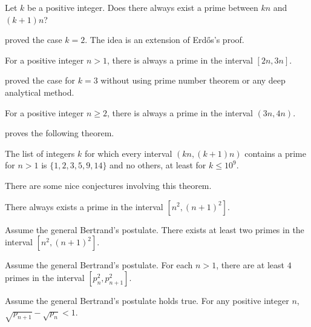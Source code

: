 \documentclass{subfile}
\begin{document}
	\begin{problem}
		Let $k$ be a positive integer. Does there always exist a prime between $kn$ and $(k+1)n$?
	\end{problem}
\textcite{bachraoui_2006} proved the case $k=2$. The idea is an extension of Erd\H{o}s's proof.
	\begin{theorem}[Bachraoui]
		For a positive integer $n>1$, there is always a prime in the interval $[2n,3n]$.
	\end{theorem}
\textcite{loo_2011} proved the case for $k=3$ without using prime number theorem or any deep analytical method.
	\begin{theorem}[Loo]
		For a positive integer $n\geq2$, there is always a prime in the interval $(3n,4n)$.
	\end{theorem}
\textcite{moses_shevelev_greathouse_2013} proves the following theorem.
	\begin{theorem}
		The list of integers $k$ for which every interval $(kn,(k+1)n)$ contains a prime for $n>1$ is $\{1,2,3,5,9,14\}$ and no others, at least for $k\leq10^9$.
	\end{theorem}
There are some nice conjectures involving this theorem.
	\begin{conjecture}
		There always exists a prime in the interval $[n^2,(n+1)^2]$.
	\end{conjecture}

	\begin{theorem}
		Assume the general Bertrand's postulate. There exists at least two primes in the interval $[n^2,(n+1)^2]$.
	\end{theorem}

	\begin{theorem}
		Assume the general Bertrand's postulate. For each $n>1$, there are at least $4$ primes in the interval $[p_n^2,p_{n+1}^2]$.
	\end{theorem}

	\begin{theorem}
		Assume the general Bertrand's postulate holds true. For any positive integer $n$, $\sqrt{p_{n+1}}-\sqrt{p_n}<1$.
	\end{theorem}
\end{document}
